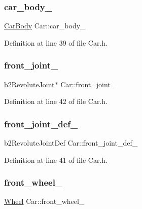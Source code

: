 \subsubsection{\texorpdfstring{car\+\_\+body\+\_\+}{car\_body\_}}
{\footnotesize\ttfamily \hyperlink{classCarBody}{Car\+Body} Car\+::car\+\_\+body\+\_\+\hspace{0.3cm}{\ttfamily [private]}}



Definition at line 39 of file Car.\+h.

\mbox{\label{classCar_a65195e0f8bdcb242616b6c285d7ff07a}} 
\subsubsection{\texorpdfstring{front\+\_\+joint\+\_\+}{front\_joint\_}}
{\footnotesize\ttfamily b2\+Revolute\+Joint$\ast$ Car\+::front\+\_\+joint\+\_\+\hspace{0.3cm}{\ttfamily [private]}}



Definition at line 42 of file Car.\+h.

\mbox{\label{classCar_a4e2939a9c523e2e264ea2377a4829f7c}} 
\subsubsection{\texorpdfstring{front\+\_\+joint\+\_\+def\+\_\+}{front\_joint\_def\_}}
{\footnotesize\ttfamily b2\+Revolute\+Joint\+Def Car\+::front\+\_\+joint\+\_\+def\+\_\+\hspace{0.3cm}{\ttfamily [private]}}



Definition at line 41 of file Car.\+h.

\mbox{\label{classCar_a9c6abcefc82b364b09e67fad1b200beb}} 
\subsubsection{\texorpdfstring{front\+\_\+wheel\+\_\+}{front\_wheel\_}}
{\footnotesize\ttfamily \hyperlink{classWheel}{Wheel} Car\+::front\+\_\+wheel\+\_\+\hspace{0.3cm}{\ttfamily [private]}}



